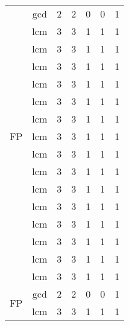 \begin{table}[ht]
\begin{center}
{\begin{tabular}{cc|c|c|c|c|c|}
\cline{1-7}
\multicolumn{1}{|c|}{\multirow{15}{*}{FP}} & \multicolumn{1}{|c|}{gcd} & 2 & 2 & 0 & 0 & 1 \\
\cline{2-7}
\multicolumn{1}{|c|}{}                        & \multicolumn{1}{|c|}{lcm} & 3 & 3 & 1 & 1 & 1 \\
\cline{2-7}
\multicolumn{1}{|c|}{}                        & \multicolumn{1}{|c|}{lcm} & 3 & 3 & 1 & 1 & 1 \\
\cline{2-7}
\multicolumn{1}{|c|}{}                        & \multicolumn{1}{|c|}{lcm} & 3 & 3 & 1 & 1 & 1 \\
\cline{2-7}
\multicolumn{1}{|c|}{}                        & \multicolumn{1}{|c|}{lcm} & 3 & 3 & 1 & 1 & 1 \\
\cline{2-7}
\multicolumn{1}{|c|}{}                        & \multicolumn{1}{|c|}{lcm} & 3 & 3 & 1 & 1 & 1 \\
\cline{2-7}
\multicolumn{1}{|c|}{}                        & \multicolumn{1}{|c|}{lcm} & 3 & 3 & 1 & 1 & 1 \\
\cline{2-7}
\multicolumn{1}{|c|}{}                        & \multicolumn{1}{|c|}{lcm} & 3 & 3 & 1 & 1 & 1 \\
\cline{2-7}
\multicolumn{1}{|c|}{}                        & \multicolumn{1}{|c|}{lcm} & 3 & 3 & 1 & 1 & 1 \\
\cline{2-7}
\multicolumn{1}{|c|}{}                        & \multicolumn{1}{|c|}{lcm} & 3 & 3 & 1 & 1 & 1 \\
\cline{2-7}
\multicolumn{1}{|c|}{}                        & \multicolumn{1}{|c|}{lcm} & 3 & 3 & 1 & 1 & 1 \\
\cline{2-7}
\multicolumn{1}{|c|}{}                        & \multicolumn{1}{|c|}{lcm} & 3 & 3 & 1 & 1 & 1 \\
\cline{2-7}
\multicolumn{1}{|c|}{}                        & \multicolumn{1}{|c|}{lcm} & 3 & 3 & 1 & 1 & 1 \\
\cline{2-7}
\multicolumn{1}{|c|}{}                        & \multicolumn{1}{|c|}{lcm} & 3 & 3 & 1 & 1 & 1 \\
\cline{2-7}
\multicolumn{1}{|c|}{}                        & \multicolumn{1}{|c|}{lcm} & 3 & 3 & 1 & 1 & 1 \\
\cline{2-7}
\multicolumn{1}{|c|}{}                        & \multicolumn{1}{|c|}{lcm} & 3 & 3 & 1 & 1 & 1 \\
\multicolumn{1}{|c|}{\multirow{15}{*}{FP}} & \multicolumn{1}{|c|}{gcd} & 2 & 2 & 0 & 0 & 1 \\
\cline{2-7}
\multicolumn{1}{|c|}{}                        & \multicolumn{1}{|c|}{lcm} & 3 & 3 & 1 & 1 & 1 \\

\end{tabular}}
\end{center}
\end{table}
